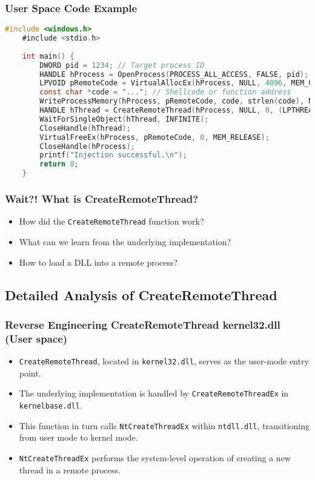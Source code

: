 \begin{frame}[fragile]
\frametitle{User Space Code Example}
    \begin{lstlisting}[language=C, keywordstyle=\color{red}, keywords={CreateRemoteThread, OpenProcess, VirtualAllocEx, WriteProcessMemory}]
    #include <windows.h>
    #include <stdio.h>
    
    int main() {
        DWORD pid = 1234; // Target process ID
        HANDLE hProcess = OpenProcess(PROCESS_ALL_ACCESS, FALSE, pid);
        LPVOID pRemoteCode = VirtualAllocEx(hProcess, NULL, 4096, MEM_COMMIT, PAGE_EXECUTE_READWRITE);
        const char *code = "..."; // Shellcode or function address
        WriteProcessMemory(hProcess, pRemoteCode, code, strlen(code), NULL);
        HANDLE hThread = CreateRemoteThread(hProcess, NULL, 0, (LPTHREAD_START_ROUTINE)pRemoteCode, NULL, 0, NULL);
        WaitForSingleObject(hThread, INFINITE);
        CloseHandle(hThread);
        VirtualFreeEx(hProcess, pRemoteCode, 0, MEM_RELEASE);
        CloseHandle(hProcess);
        printf("Injection successful.\n");
        return 0;
    }
    \end{lstlisting}
\end{frame}

\begin{frame}
    \frametitle{Wait?! What is CreateRemoteThread?}
    \begin{itemize}
        \item How did the \texttt{\color{blue}CreateRemoteThread} function work?
        \item What can we learn from the underlying implementation?
        \item How to load a DLL into a remote process?
    \end{itemize}
\end{frame}

\subsection{Detailed Analysis of CreateRemoteThread}
\begin{frame}
    \frametitle{Reverse Engineering CreateRemoteThread kernel32.dll (User space)}
    \begin{itemize}
        \item \texttt{\color{blue}CreateRemoteThread}, located in \texttt{kernel32.dll}, serves as the user-mode entry point.
        \item The underlying implementation is handled by \texttt{\color{blue}CreateRemoteThreadEx} in \texttt{kernelbase.dll}.
        \item This function in turn calls \texttt{\color{blue}NtCreateThreadEx} within \texttt{ntdll.dll}, transitioning from user mode to kernel mode.
        \item \texttt{\color{blue}NtCreateThreadEx} performs the system-level operation of creating a new thread in a remote process.
    \end{itemize}
\end{frame}

